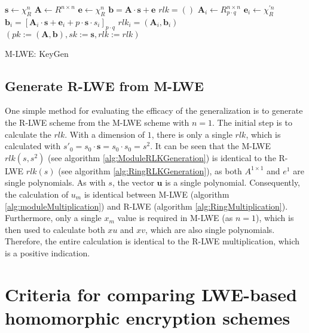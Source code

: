 \begin{algorithm}[htb]
  \begin{algorithmic}[1]
    \STATE $\textbf{s} \leftarrow \chi_R^n$
    \STATE $\textbf{A} \leftarrow R^{n \times n}$
    \STATE $\textbf{e} \leftarrow \chi_R^n$
    \STATE $\textbf{b} = \textbf{A}\cdot \textbf{s}+\textbf{e}$
    \STATE $rlk = ()$
    \STATE $\textbf{A}_i \leftarrow R_{p \cdot q}^{n \times n}$
    \STATE $\textbf{e}_i \leftarrow \chi_R^{'n}$
    \STATE $\textbf{b}_i = [\textbf{A}_i\cdot \textbf{s}+\textbf{e}_i+p\cdot \textbf{s} \cdot s_i]_{p \cdot q}$
    \STATE $rlk_i = (\textbf{A}_i, \textbf{b}_i)$
    \ENDFOR
    \RETURN $(pk:=(\textbf{A}, \textbf{b}), sk:=\textbf{s}, rlk:= rlk )$
  \end{algorithmic}
  \caption{M-LWE: KeyGen}
  \label{alg:HomomorphKeyGen}
\end{algorithm}

\subsection*{Generate R-LWE from M-LWE}

One simple method for evaluating the efficacy of the generalization is to generate the R-LWE scheme from the M-LWE scheme with $n=1$. The initial step is to calculate the $rlk$. With a dimension of $1$, there is only a single $rlk$, which is calculated with $s'_0 = s_0 \cdot \textbf{s} = s_0 \cdot s_0 = s^2$. It can be seen that the M-LWE $rlk(s, s^2)$ (see algorithm \ref{alg:ModuleRLKGeneration}) is identical to the R-LWE $rlk(s)$ (see algorithm \ref{alg:RingRLKGeneration}), as both $A^{1 \times 1}$ and $e^1$ are single polynomials. As with $s$, the vector $\textbf{u}$ is a single polynomial. Consequently, the calculation of $u_m$ is identical between M-LWE (algorithm \ref{alg:moduleMultiplication}) and R-LWE (algorithm \ref{alg:RingMultiplication}). Furthermore, only a single $x_m$ value is required in M-LWE (as $n=1$), which is then used to calculate both $xu$ and $xv$, which are also single polynomials. Therefore, the entire calculation is identical to the R-LWE multiplication, which is a positive indication.


\section{Criteria for comparing LWE-based homomorphic encryption schemes}
\label{sec:HomomorphCriteria}

